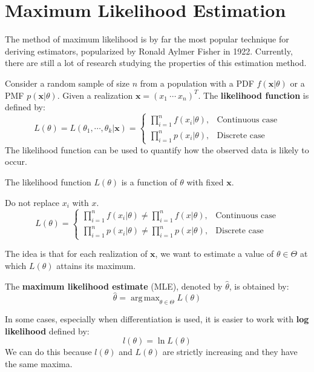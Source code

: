 \documentclass{huhtakm-template-book-v2}
\DeclareMathOperator*{\argmax}{arg\,max}
\begin{document}
\newpage
\section{Maximum Likelihood Estimation}
The method of maximum likelihood is by far the most popular technique for deriving estimators, popularized by Ronald Aylmer Fisher in 1922. Currently, there are still a lot of research studying the properties of this estimation method.
\begin{defn}
	Consider a random sample of size $n$ from a population with a PDF $f(\mathbf{x}|\theta)$ or a PMF $p(\mathbf{x}|\theta)$. Given a realization $\mathbf{x}=(x_{1}\ \cdots\ x_{n})^{T}$. The \textbf{likelihood function} is defined by:
	\begin{equation*}
		L(\theta)=L(\theta_{1},\cdots,\theta_{k}|\mathbf{x})=\begin{cases}
			\prod_{i=1}^{n}f(x_{i}|\theta), &\text{Continuous case}\\
			\prod_{i=1}^{n}p(x_{i}|\theta), &\text{Discrete case}
		\end{cases}
	\end{equation*}
	The likelihood function can be used to quantify how the observed data is likely to occur.
\end{defn}
\begin{rem}
	The likelihood function $L(\theta)$ is a function of $\theta$ with fixed $\mathbf{x}$.
\end{rem}
\begin{rem}
	Do not replace $x_{i}$ with $x$.
	\begin{equation*}
		L(\theta)=\begin{cases}
			\prod_{i=1}^{n}f(x_{i}|\theta)\neq\prod_{i=1}^{n}f(x|\theta), &\text{Continuous case}\\
			\prod_{i=1}^{n}p(x_{i}|\theta)\neq\prod_{i=1}^{n}p(x|\theta), &\text{Discrete case}
		\end{cases}
	\end{equation*}
\end{rem}
The idea is that for each realization of $\mathbf{x}$, we want to estimate a value of $\theta\in\Theta$ at which $L(\theta)$ attains its maximum.
\begin{defn}
	The \textbf{maximum likelihood estimate} (MLE), denoted by $\hat{\theta}$, is obtained by:
	\begin{equation*}
		\hat{\theta}=\argmax_{\theta\in\Theta}L(\theta)
	\end{equation*}
\end{defn}
\begin{rem}
	In some cases, especially when differentiation is used, it is easier to work with \textbf{log likelihood} defined by:
	\begin{equation*}
		l(\theta)=\ln{L(\theta)}
	\end{equation*}
	We can do this because $l(\theta)$ and $L(\theta)$ are strictly increasing and they have the same maxima. 
\end{rem}
\end{document}
